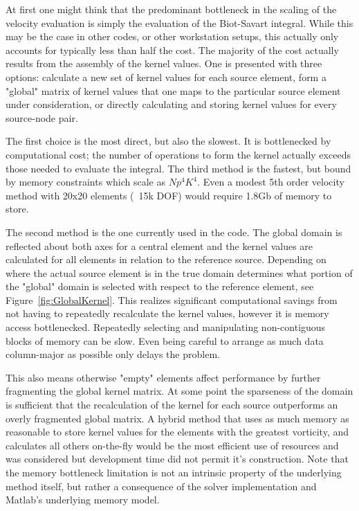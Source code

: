 \documentclass[letterpaper,12pt]{report}
\begin{document}
At first one might think that the predominant bottleneck in the scaling of the velocity evaluation is simply the evaluation of the Biot-Savart integral. While this may be the case in other codes, or other workstation setups, this actually only accounts for typically less than half the cost. The majority of the cost actually results from the assembly of the kernel values. One is presented with three options: calculate a new set of kernel values for each source element, form a "global" matrix of kernel values that one maps to the particular source element under consideration, or directly calculating and storing kernel values for every source-node pair.

The first choice is the most direct, but also the slowest. It is bottlenecked by computational cost; the number of operations to form the kernel actually exceeds those needed to evaluate the integral. The third method is the fastest, but bound by memory constraints which scale as $Np^4 K^4$. Even a modest 5th order velocity method with 20x20 elements (~15k DOF) would require 1.8Gb of memory to store.

The second method is the one currently used in the code. The global domain is reflected about both axes for a central element and the kernel values are calculated for all elements in relation to the reference source. Depending on where the actual source element is in the true domain determines what portion of the "global" domain is selected with respect to the reference element, see Figure~\ref{fig:GlobalKernel}. This realizes significant computational savings from not having to repeatedly recalculate the kernel values, however it is memory access bottlenecked. Repeatedly selecting and manipulating non-contiguous blocks of memory can be slow. Even being careful to arrange as much data column-major as possible only delays the problem.

This also means otherwise "empty" elements affect performance by further fragmenting the global kernel matrix. At some point the sparseness of the domain is sufficient that the recalculation of the kernel for each source outperforms an overly fragmented global matrix. A hybrid method that uses as much memory as reasonable to store kernel values for the elements with the greatest vorticity, and calculates all others on-the-fly would be the most efficient use of resources and was considered but development time did not permit it's construction. Note that the memory bottleneck limitation is not an intrinsic property of the underlying method itself, but rather a consequence of the solver implementation and Matlab's underlying memory model.
\end{document}
